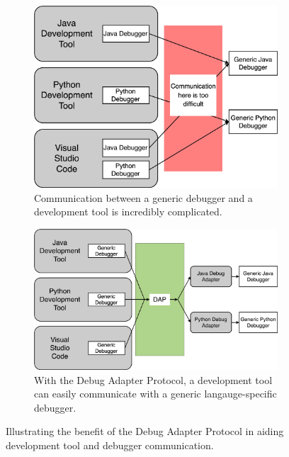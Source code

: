 \documentclass{article}
\begin{document}
\begin{figure}[h]
    \begin{subfigure}[c][][c]{0.45\textwidth}
        \includegraphics[width=\textwidth]{no-dap-theory.png}
        \caption{
            \centering
                Communication between a generic debugger and a development tool is incredibly complicated.
        }
        \label{fig:no-dap-theory}
    \end{subfigure}
    \hspace{0.05\textwidth}
    \begin{subfigure}[c][][c]{0.45\textwidth}
        \includegraphics[width=\textwidth]{dap-theory.png}
        \caption{
            \centering
                With the Debug Adapter Protocol, a development tool can easily communicate with a generic langauge-specific debugger.
        }
        \label{fig:dap-theory}
    \end{subfigure}
    \caption{
        \centering
            Illustrating the benefit of the Debug Adapter Protocol in aiding development tool and debugger communication.
    }
    \label{fig:dap}
\end{figure}
\end{document}
